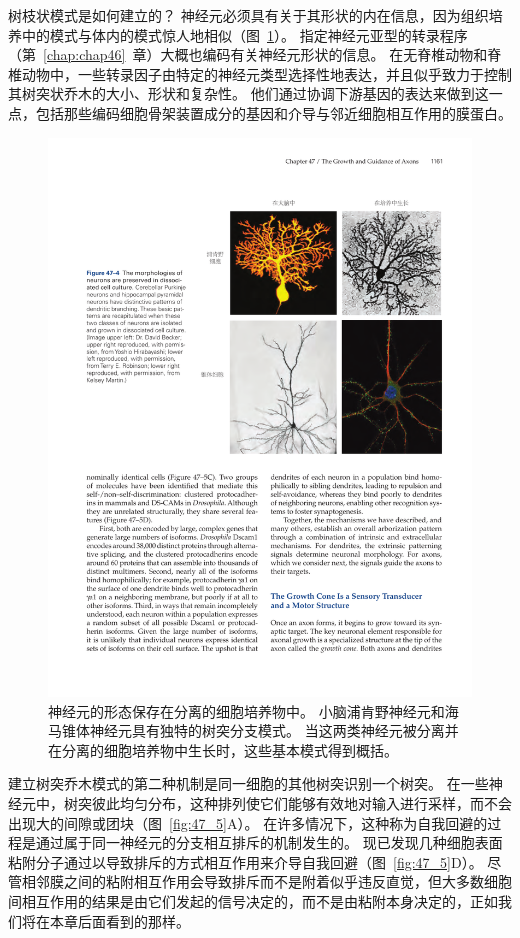 树枝状模式是如何建立的？
神经元必须具有关于其形状的内在信息，因为组织培养中的模式与体内的模式惊人地相似（图~\ref{fig:47_4}）。
指定神经元亚型的转录程序（第~\ref{chap:chap46}~章）大概也编码有关神经元形状的信息。
在无脊椎动物和脊椎动物中，一些转录因子由特定的神经元类型选择性地表达，并且似乎致力于控制其树突状乔木的大小、形状和复杂性。
他们通过协调下游基因的表达来做到这一点，包括那些编码细胞骨架装置成分的基因和介导与邻近细胞相互作用的膜蛋白。


\begin{figure}[htbp]
	\centering
	\includegraphics[width=0.8\linewidth]{chap47/fig_47_4}
	\caption{神经元的形态保存在分离的细胞培养物中。
		小脑浦肯野神经元和海马锥体神经元具有独特的树突分支模式。
		当这两类神经元被分离并在分离的细胞培养物中生长时，这些基本模式得到概括。}
	\label{fig:47_4}
\end{figure}


建立树突乔木模式的第二种机制是同一细胞的其他树突识别一个树突。
在一些神经元中，树突彼此均匀分布，这种排列使它们能够有效地对输入进行采样，而不会出现大的间隙或团块（图~\ref{fig:47_5}A）。
在许多情况下，这种称为自我回避的过程是通过属于同一神经元的分支相互排斥的机制发生的。
现已发现几种细胞表面粘附分子通过以导致排斥的方式相互作用来介导自我回避（图~\ref{fig:47_5}D）。
尽管相邻膜之间的粘附相互作用会导致排斥而不是附着似乎违反直觉，但大多数细胞间相互作用的结果是由它们发起的信号决定的，而不是由粘附本身决定的，正如我们将在本章后面看到的那样。


